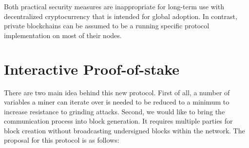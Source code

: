 \documentclass[preprint,review,3p,times,twocolumn]{elsarticle}
\begin{document}
Both practical security measures are inappropriate for long-term use with decentralized cryptocurrency that is intended for global adoption. In contrast, private blockchains can be assumed to be a running specific protocol implementation on most of their nodes. 

\section{Interactive Proof-of-stake}
\label{s_ipos}

There are two main idea behind this new protocol. First of all, a number of variables a miner can iterate over is needed to be reduced to a minimum to increase resistance to grinding attacks. Second, we would like to bring the communication process into block generation. It requires multiple parties for block creation without broadcasting undersigned blocks within the network. The proposal for this protocol is as follows:
\end{document}
